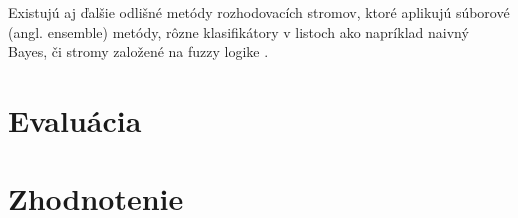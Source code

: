 \par
Existujú aj ďalšie odlišné metódy rozhodovacích stromov, ktoré aplikujú súborové (angl. ensemble) metódy, rôzne klasifikátory v listoch ako napríklad naivný Bayes, či stromy založené na fuzzy logike \citep{aggarwal2014survey}.


\section{Evaluácia}



\section{Zhodnotenie}
